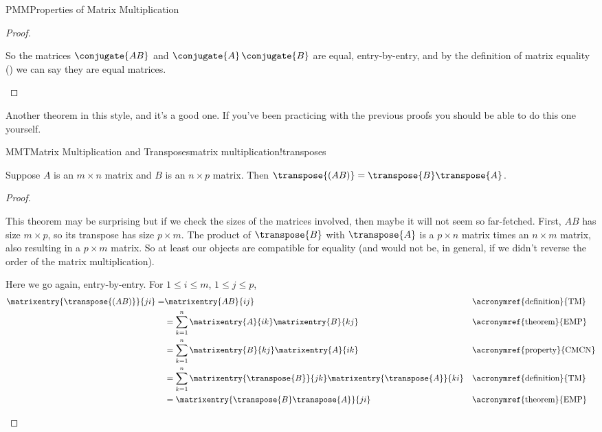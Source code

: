 \begin{subsect}{PMM}{Properties of Matrix Multiplication}
\begin{proof}
\begin{para}
\end{para}
%
\begin{para}So the matrices $\conjugate{AB}$ and $\conjugate{A}\,\conjugate{B}$ are equal, entry-by-entry, and by the definition of matrix equality () we can say they are equal matrices.\end{para}
%
\end{proof}
%
\begin{para}Another theorem in this style, and it's a good one.  If you've been practicing with the previous proofs you should be able to do this one yourself.\end{para}
%
\begin{theorem}{MMT}{Matrix Multiplication and Transposes}{matrix multiplication!transposes}
\begin{para}Suppose $A$ is an $m\times n$ matrix and $B$ is an $n\times p$ matrix.  Then $\transpose{(AB)}=\transpose{B}\transpose{A}$.\end{para}
\end{theorem}
%
\begin{proof}
\begin{para}This theorem may be surprising but if we check the sizes of the matrices involved, then maybe it will not seem so far-fetched.  First, $AB$ has size $m\times p$, so its transpose has size $p\times m$.  The product of $\transpose{B}$ with $\transpose{A}$ is a $p\times n$ matrix times an $n\times m$ matrix, also resulting in a $p\times m$ matrix.  So at least our objects are compatible for equality (and would not be, in general, if we didn't reverse the order of the matrix multiplication).\end{para}
%
\begin{para}Here we go again, entry-by-entry.  For $1\leq i\leq m$, $1\leq j\leq p$,
%
\begin{align*}
\matrixentry{\transpose{(AB)}}{ji}=&\matrixentry{AB}{ij}
&&\text{\acronymref{definition}{TM}}\\
%
&=\sum_{k=1}^{n}\matrixentry{A}{ik}\matrixentry{B}{kj}
&&\text{\acronymref{theorem}{EMP}}\\
%
&=\sum_{k=1}^{n}\matrixentry{B}{kj}\matrixentry{A}{ik}
&&\text{\acronymref{property}{CMCN}}\\
%
&=\sum_{k=1}^{n}\matrixentry{\transpose{B}}{jk}\matrixentry{\transpose{A}}{ki}
&&\text{\acronymref{definition}{TM}}\\
%
&=\matrixentry{\transpose{B}\transpose{A}}{ji}
&&\text{\acronymref{theorem}{EMP}}
%
\end{align*}

\end{para}
\end{proof}
\end{subsect}
